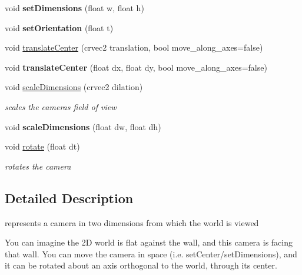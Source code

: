 \begin{DoxyCompactItemize}
\item 
\mbox{\label{classnta_1_1Camera2D_a253821b9dc464678c80ff92c31a8689f}} 
void {\bfseries set\+Dimensions} (float w, float h)
\item 
\mbox{\label{classnta_1_1Camera2D_ae1b3a5ef4259881936317fc0c18c4a13}} 
void {\bfseries set\+Orientation} (float t)
\item 
void \hyperlink{classnta_1_1Camera2D_a711b1b64b4e0bbca5c598ac15609f498}{translate\+Center} (crvec2 translation, bool move\+\_\+along\+\_\+axes=false)
\item 
\mbox{\label{classnta_1_1Camera2D_a95ecd50d9ec6031b4d015f33d442d096}} 
void {\bfseries translate\+Center} (float dx, float dy, bool move\+\_\+along\+\_\+axes=false)
\item 
\mbox{\label{classnta_1_1Camera2D_aa89b58a2a5ca0c3df56d07e2722afcd6}} 
void \hyperlink{classnta_1_1Camera2D_aa89b58a2a5ca0c3df56d07e2722afcd6}{scale\+Dimensions} (crvec2 dilation)
\begin{DoxyCompactList}\small\item\em scales the camera\textquotesingle{}s field of view \end{DoxyCompactList}\item 
\mbox{\label{classnta_1_1Camera2D_ae5e80a376fe4b6457e712c6bc94b8584}} 
void {\bfseries scale\+Dimensions} (float dw, float dh)
\item 
\mbox{\label{classnta_1_1Camera2D_a4529f2111c2621764c42365df5a504e0}} 
void \hyperlink{classnta_1_1Camera2D_a4529f2111c2621764c42365df5a504e0}{rotate} (float dt)
\begin{DoxyCompactList}\small\item\em rotates the camera \end{DoxyCompactList}\end{DoxyCompactItemize}


\subsection{Detailed Description}
represents a camera in two dimensions from which the world is viewed

You can imagine the 2D world is flat against the wall, and this camera is facing that wall. You can move the camera in space (i.\+e. set\+Center/set\+Dimensions), and it can be rotated about an axis orthogonal to the world, through its center. 

